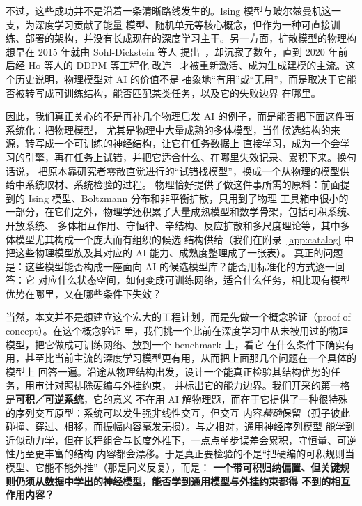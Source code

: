 \documentclass[11pt]{article}
\theoremstyle{definition}
\theoremstyle{plain}
\begin{document}
不过，这些成功并不是沿着一条清晰路线发生的。Ising 模型与玻尔兹曼机这一支，为深度学习贡献了能量
模型、随机单元等核心概念，但作为一种可直接训练、部署的架构，并没有长成现在的深度学习主干。另一方面，扩散模型的物理构想早在 2015 年就由 Sohl-Dickstein 等人
提出~\citep{sohldickstein2015deep}，却沉寂了数年，直到 2020 年前后经 Ho 等人的 DDPM 等工程化
改造~\citep{ho2020denoising} 才被重新激活、成为生成建模的主流。这个历史说明，物理模型对 AI 的价值不是
抽象地“有用”或“无用”，而是取决于它能否被转写成可训练结构，能否匹配某类任务，以及它的失败边界
在哪里。

因此，我们真正关心的不是再补几个物理启发 AI 的例子，而是能否把下面这件事系统化：把物理模型，
尤其是物理中大量成熟的多体模型，当作候选结构的来源，转写成一个可训练的神经结构，让它在任务数据上
直接学习，成为一个会学习的引擎，再在任务上试错，并把它适合什么、在哪里失效记录、累积下来。换句话说，
把原本靠研究者零散直觉进行的“试错找模型”，换成一个从物理的模型供给中系统取材、系统检验的过程。
物理恰好提供了做这件事所需的原料：前面提到的 Ising 模型、Boltzmann 分布和非平衡扩散，只用到了物理
工具箱中很小的一部分，在它们之外，物理学还积累了大量成熟模型和数学骨架，包括可积系统、开放系统、
多体相互作用、守恒律、辛结构、反应扩散和多尺度理论等，其中多体模型尤其构成一个庞大而有组织的候选
结构供给（我们在附录~\ref{app:catalog} 中把这些物理模型族及其对应的 AI 能力、成熟度整理成了一张表）。
真正的问题是：这些模型能否构成一座面向 AI 的候选模型库？能否用标准化的方式逐一回答：它
对应什么状态空间，如何变成可训练网络，适合什么任务，相比现有模型优势在哪里，又在哪些条件下失效？

当然，本文并不是想建立这个宏大的工程计划，而是先做一个概念验证（proof of concept）。在这个概念验证
里，我们挑一个此前在深度学习中从未被用过的物理模型，把它做成可训练网络、放到一个 benchmark 上，看它
在什么条件下确实有用，甚至比当前主流的深度学习模型更有用，从而把上面那几个问题在一个具体的模型上
回答一遍。沿途从物理结构出发，设计一个能真正检验其结构优势的任务，用审计对照排除硬编与外挂约束，
并标出它的能力边界。我们开采的第一格是\textbf{可积／可逆系统}，它的意义
不在用 AI 解物理题，而在于它提供了一种很特殊的序列交互原型：系统可以发生强非线性交互，但交互
内容\emph{精确}保留（孤子彼此碰撞、穿过、相移，而振幅内容毫发无损）。与之相对，通用神经序列模型
能学到近似动力学，但在长程组合与长度外推下，一点点单步误差会累积，守恒量、可逆性乃至更丰富的结构
内容都会漂移。于是真正要检验的不是“把硬编的可积规则当模型、它能不能外推”（那是同义反复），而是：
\textbf{一个带可积归纳偏置、但关键规则仍须从数据中学出的神经模型，能否学到通用模型与外挂约束都得
不到的相互作用内容？}
\end{document}
